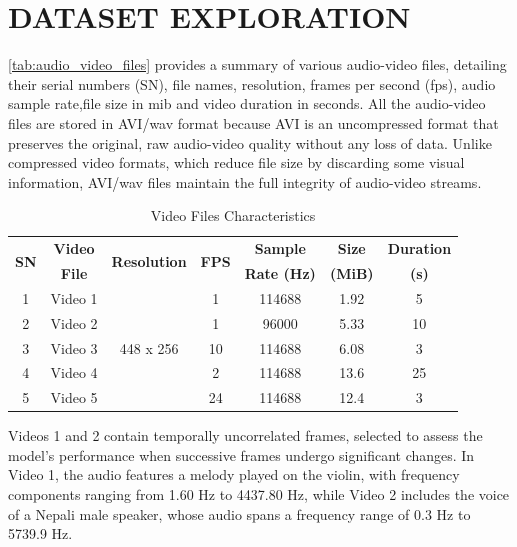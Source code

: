 \documentclass{ioereport}
\begin{document}
    \pagebreak

\section{\MakeUppercase{Dataset Exploration}}

\autoref{tab:audio_video_files} provides a summary of various audio-video files, detailing their serial numbers (SN), file names, resolution, frames per second (fps), audio sample rate,file size in \gls{mib} and video duration in seconds. All the audio-video files are stored in AVI/wav format because AVI is an uncompressed format that preserves the original, raw audio-video quality without any loss of data. Unlike compressed video formats, which reduce file size by discarding some visual information, AVI/wav files maintain the full integrity of audio-video streams.

\begin{table}[H]
    \centering
    \caption{Video Files Characteristics}
    \label{tab:audio_video_files}
    \begin{tabular}{|c|c|c|c|c|c|c|}
        \hline
        \multirow{2}{*}{\textbf{SN}} & \textbf{Video} & \multirow{2}{*}{\textbf{Resolution}} & \multirow{2}{*}{\textbf{FPS}} & \multicolumn{1}{c|}{\textbf{Sample}} & \multicolumn{1}{c|}{\textbf{Size}} & \multicolumn{1}{c|}{\textbf{Duration}} \\ 
        &\textbf{File} & & & \textbf{Rate (Hz)} & \textbf{(MiB)} & \textbf{(s)} \\ 
        \hline 
        1 & Video 1 & \multirow{5}{*}{448 x 256} & 1 & 114688 & 1.92 & 5 \\ 
        \cline{1-2} \cline{4-7}
        2 & Video 2 & & 1 & 96000 & 5.33 & 10 \\ 
        \cline{1-2} \cline{4-7}
        3 & Video 3 & & 10 & 114688 & 6.08 & 3 \\ 
        \cline{1-2} \cline{4-7}
        4 & Video 4 & & 2 & 114688 & 13.6 & 25 \\ 
        \cline{1-2} \cline{4-7}
        5 & Video 5 & & 24 & 114688 & 12.4 & 3 \\ 
        \hline
    \end{tabular}
\end{table}

Videos 1 and 2 contain temporally uncorrelated frames, selected to assess the model's performance when successive frames undergo significant changes. In Video 1, the audio features a melody played on the violin, with frequency components ranging from 1.60 Hz to 4437.80 Hz, while Video 2 includes the voice of a Nepali male speaker, whose audio spans a frequency range of 0.3 Hz to 5739.9 Hz.
\end{document}
